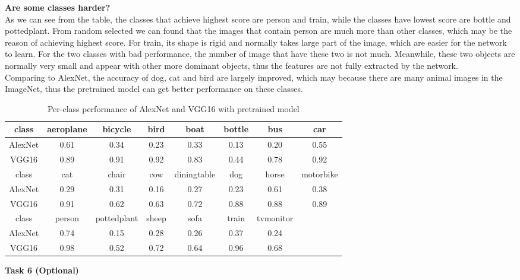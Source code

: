 \documentclass[12pt]{report}
\begin{document}
\begin{outline}
\textbf{Are some classes harder?}\\

As we can see from the table, the classes that achieve highest score are person and train, while the classes have lowest score are bottle and pottedplant. From random selected we can found that the images that contain person are much more than other classes, which may be the reason of achieving highest score. For train, its shape is rigid and normally takes large part of the image, which are easier for the network to learn. For the two classes with bad performance, the number of image that have these two is not much. Meanwhile, these two objects are normally very small and appear with other more dominant objects, thus the features are not fully extracted by the network.\\
Comparing to AlexNet, the accuracy of dog, cat and bird are largely improved, which may because there are many animal images in the ImageNet, thus the pretrained model can get better performance on these classes.\\



\begin{table}
\begin{center}
\begin{tabular}{c|c c c c c c c }
\hline
class & aeroplane & bicycle & bird & boat & bottle & bus & car \\
\hline
AlexNet & 0.61 & 0.34 & 0.23 & 0.33 & 0.13 & 0.20 & 0.55\\
VGG16 & 0.89 & 0.91 & 0.92 & 0.83 & 0.44 & 0.78 & 0.92\\
\hline
\hline
class & cat & chair & cow & diningtable & dog & horse & motorbike \\
\hline
AlexNet & 0.29 & 0.31 & 0.16 & 0.27 & 0.23 & 0.61 & 0.38\\
VGG16 & 0.91 & 0.62 & 0.63 & 0.72 & 0.88 & 0.88 & 0.89\\
\hline
\hline
class & person & pottedplant & sheep & sofa & train & tvmonitor &   \\
\hline
AlexNet & 0.74 & 0.15 & 0.28 & 0.26 & 0.37 & 0.24 &  \\
VGG16 & 0.98 & 0.52 & 0.72 & 0.64 & 0.96 & 0.68 &  \\
\end{tabular}
\end{center}
\caption{Per-class performance of AlexNet and VGG16 with pretrained model}
\end{table}

\item \textbf{Task 6 (Optional)}\\


\end{outline}
\end{document}
